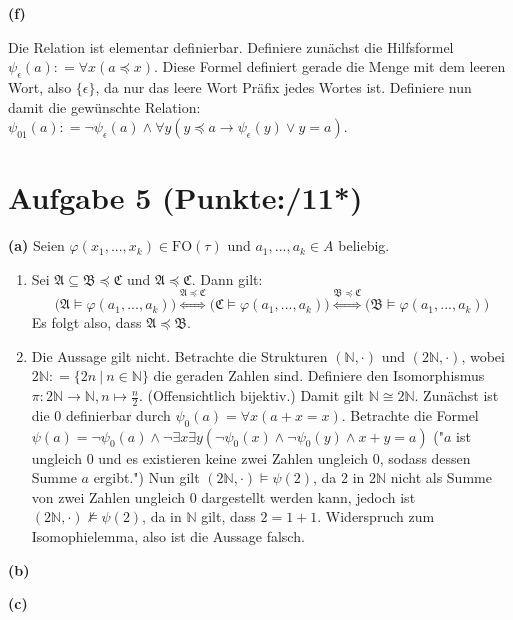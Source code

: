 \documentclass[11pt, a4paper]{article}
\newcommand{\pppp}{11*}
\newcommand{\defgr}{\mathrel{\mathop:\!\!=}}
\newcommand{\struc}[1]{\ensuremath{\mathfrak{#1}}}
\begin{document}
\textbf{(f)}
\begin{adjustwidth}{20pt}{20pt}
	Die Relation ist elementar definierbar. Definiere zunächst die Hilfsformel $\psi_\epsilon(a) \defgr \forall x(a \preceq x)$. Diese Formel definiert gerade die Menge mit dem leeren Wort, also
	$\{\epsilon\}$, da nur das leere Wort Präfix jedes Wortes ist. Definiere nun damit die gewünschte Relation:\\
	$\psi_{01}(a) \defgr \neg\psi_\epsilon(a) \wedge \forall y(y \preceq a \rightarrow \psi_\epsilon(y) \vee y=a)$.
\end{adjustwidth}


\section*{Aufgabe 5 (Punkte:\qquad/\pppp)}
\textbf{(a)} Seien $\varphi(x_1,...,x_k) \in \text{FO}(\tau)$ und $a_1,...,a_k \in A$ beliebig.
\begin{enumerate}[label=(\roman*)]
\item Sei $\struc{A} \subseteq \struc{B} \preceq \struc{C}$ und $\struc{A} \preceq \struc{C}$. Dann gilt:
	$$\bigg( \struc{A} \models \varphi(a_1,...,a_k) \bigg) \overset{\struc{A} \preceq \struc{C}}{\Leftrightarrow} \bigg( \struc{C} \models \varphi(a_1,...,a_k) \bigg)
	\overset{\struc{B} \preceq \struc{C}}{\Leftrightarrow} \bigg( \struc{B} \models \varphi(a_1,...,a_k) \bigg)$$
Es folgt also, dass $\struc{A} \preceq \struc{B}$.
\item Die Aussage gilt nicht. Betrachte die Strukturen $(\mathbb{N},\cdot)$ und $(2\mathbb{N},\cdot)$, wobei $2\mathbb{N} \defgr \{2n\ |\ n \in \mathbb{N}\}$ die geraden Zahlen sind.
Definiere den Isomorphismus $\pi:2\mathbb{N} \to \mathbb{N}, n \mapsto \frac{n}{2}$. (Offensichtlich bijektiv.) Damit gilt $\mathbb{N} \cong 2\mathbb{N}$.
Zunächst ist die 0 definierbar durch $\psi_0(a)=\forall x(a + x = x)$. Betrachte die Formel $\psi(a)=\neg\psi_0(a) \wedge \neg \exists x \exists y(\neg\psi_0(x) \wedge \neg\psi_0(y) \wedge
x+y=a)$ ("$a$ ist ungleich 0 und es existieren keine zwei Zahlen ungleich 0, sodass dessen Summe $a$ ergibt.") Nun gilt $(2\mathbb{N},\cdot) \models \psi(2)$, da 2 in $2\mathbb{N}$
nicht als Summe von zwei Zahlen ungleich 0 dargestellt werden kann, jedoch ist $(2\mathbb{N},\cdot) \not\models \psi(2)$, da in $\mathbb{N}$ gilt, dass $2=1+1$. Widerspruch zum
Isomophielemma, also ist die Aussage falsch.
\end{enumerate}
\textbf{(b)}
\begin{adjustwidth}{20pt}{20pt}

\end{adjustwidth}
\textbf{(c)}
\begin{adjustwidth}{20pt}{20pt}

\end{adjustwidth}
\end{document}
